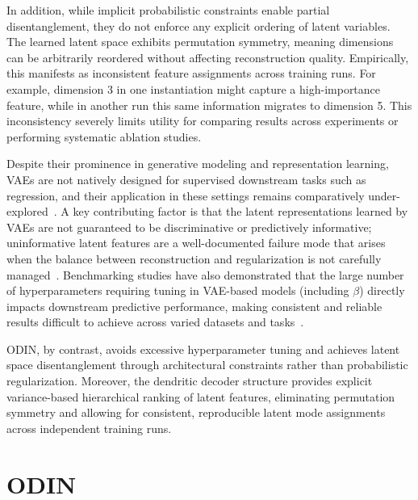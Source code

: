 \documentclass[twoside,11pt]{article}
\begin{document}
In addition, while implicit probabilistic constraints enable partial disentanglement, they do not enforce any explicit ordering of latent variables. The learned latent space exhibits permutation symmetry, meaning dimensions can be arbitrarily reordered without affecting reconstruction quality. Empirically, this manifests as inconsistent feature assignments across training runs. For example, dimension 3 in one instantiation might capture a high-importance feature, while in another run this same information migrates to dimension 5. This inconsistency severely limits utility for comparing results across experiments or performing systematic ablation studies.

Despite their prominence in generative modeling and representation learning, VAEs are not natively designed for supervised downstream tasks such as regression, and their application in these settings remains comparatively under-explored~\cite{zhao2019variational}. A key contributing factor is that the latent representations learned by VAEs are not guaranteed to be discriminative or predictively informative; uninformative latent features are a well-documented failure mode that arises when the balance between reconstruction and regularization is not carefully managed~\cite{zhao2017towards}. Benchmarking studies have also demonstrated that the large number of hyperparameters requiring tuning in VAE-based models (including $\beta$) directly impacts downstream predictive performance, making consistent and reliable results difficult to achieve across varied datasets and tasks~\cite{eltager2023benchmarking}.

ODIN, by contrast, avoids excessive hyperparameter tuning and achieves latent space disentanglement through architectural constraints rather than probabilistic regularization. Moreover, the dendritic decoder structure provides explicit variance-based hierarchical ranking of latent features, eliminating permutation symmetry and allowing for consistent, reproducible latent mode assignments across independent training runs.  

\section{ODIN}
\end{document}
